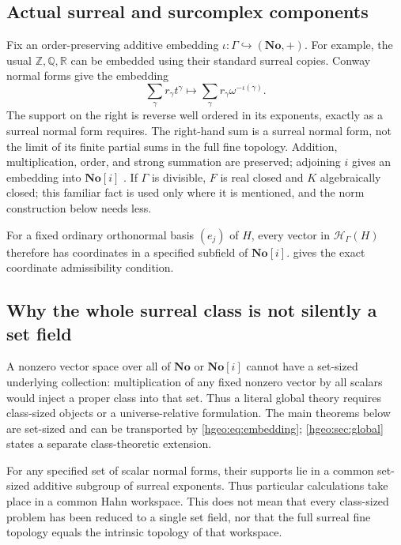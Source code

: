 \documentclass[11pt,letterpaper]{article}
\numberwithin{equation}{section}
\theoremstyle{definition}
\theoremstyle{remark}
\newcommand{\R}{\mathbb R}
\newcommand{\Q}{\mathbb Q}
\newcommand{\Z}{\mathbb Z}
\newcommand{\No}{\mathbf{No}}
\newcommand{\F}{F}
\newcommand{\K}{K}
\newcommand{\HH}[1]{\mathscr H_\Gamma(#1)}
\begin{document}
\subsection{Actual surreal and surcomplex components}
Fix an order-preserving additive embedding
$\iota:\Gamma\hookrightarrow(\No,+)$. For example, the usual
$\Z,\Q,\R$ can be embedded using their standard surreal copies.
Conway normal forms give the embedding
\begin{equation}\label{hgeo:eq:embedding}
 \sum_\gamma r_\gamma t^\gamma
 \longmapsto
 \sum_\gamma r_\gamma\omega^{-\iota(\gamma)}.
\end{equation}
The support on the right is reverse well ordered in its exponents,
exactly as a surreal normal form requires. The right-hand sum is a surreal
normal form, not the limit of its finite partial sums in the full fine
topology. Addition, multiplication, order, and strong summation are
preserved; adjoining $i$ gives an embedding into $\No[i]$
\cite{Conway,RepoFound}. If $\Gamma$ is divisible, $\F$ is real closed and
$\K$ algebraically closed; this familiar fact is used only where it is
mentioned, and the norm construction below needs less.

For a fixed ordinary orthonormal basis $(e_j)$ of $H$, every vector in
$\HH{H}$ therefore has coordinates in a specified subfield of
$\No[i]$.  gives the exact coordinate
admissibility condition.

\subsection{Why the whole surreal class is not silently a set field}
A nonzero vector space over all of $\No$ or $\No[i]$ cannot have a
set-sized underlying collection: multiplication of any fixed nonzero
vector by all scalars would inject a proper class into that set.
Thus a literal global theory requires class-sized objects or a
universe-relative formulation. The main theorems below are set-sized
and can be transported by \eqref{hgeo:eq:embedding}; \cref{hgeo:sec:global}
states a separate class-theoretic extension.

For any specified set of scalar normal forms, their supports lie in a
common set-sized additive subgroup of surreal exponents. Thus particular
calculations take place in a common Hahn workspace. This does not mean
that every class-sized problem has been reduced to a single set field,
nor that the full surreal fine topology equals the intrinsic topology of
that workspace.
\end{document}
